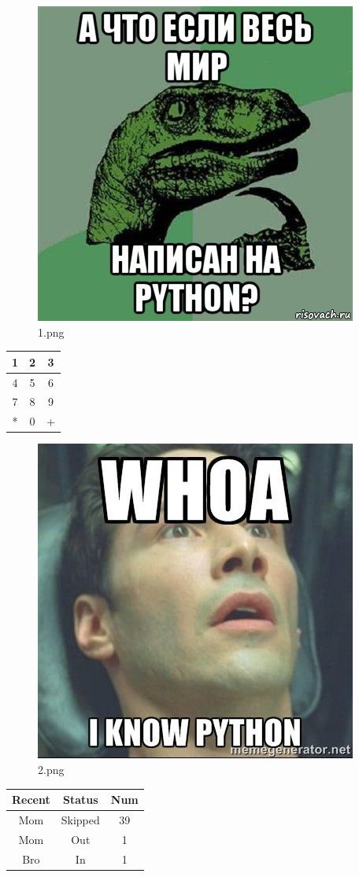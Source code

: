\documentclass{article}
\author{artem}
\begin{document}
\maketitle
\begin{figure}[H]
\centering
\includegraphics[width=0.5\linewidth]{../src_files/1.png}
\caption{1.png}
\end{figure}
\begin{table}[H]
\centering
\begin{tabular}{|c|c|c|}
\hline
1 & 2 & 3 \\ \hline
4 & 5 & 6 \\ \hline
7 & 8 & 9 \\ \hline
* & 0 & + \\ \hline
\end{tabular}
\end{table}
\begin{figure}[H]
\centering
\includegraphics[width=0.5\linewidth]{../src_files/2.png}
\caption{2.png}
\end{figure}
\begin{table}[H]
\centering
\begin{tabular}{|c|c|c|}
\hline
Recent & Status & Num \\ \hline
Mom & Skipped & 39 \\ \hline
Mom & Out & 1 \\ \hline
Bro & In & 1 \\ \hline
\end{tabular}
\end{table}
\end{document}

